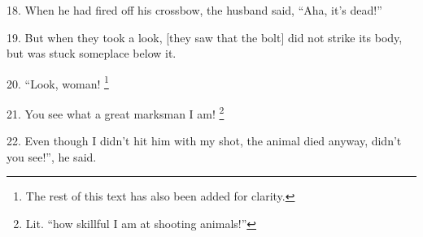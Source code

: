 18. When he had fired off his crossbow, the husband said, ``Aha, it's dead!''

19. But when they took a look, [they saw that the bolt] did not strike its body,
but was stuck someplace below it.

20. ``Look, woman! \footnote{The rest of this text has also been added for clarity.}

21. You see what a great marksman I am! \footnote{Lit. ``how skillful I am at shooting animals!''}

22. Even though I didn't hit him with my shot, the animal died anyway, didn't you
see!'', he said.

